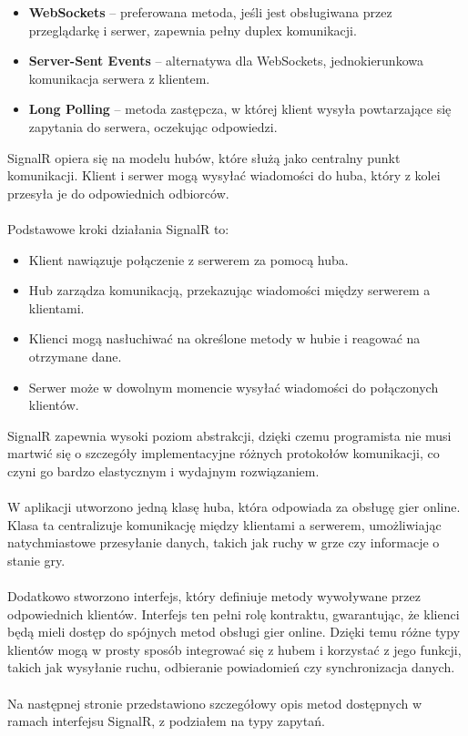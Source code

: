 \documentclass[12pt,a4paper]{article}
\begin{document}
\begin{itemize}
    \item \textbf{WebSockets} – preferowana metoda, jeśli jest obsługiwana przez przeglądarkę i serwer, zapewnia pełny duplex komunikacji.
    \item \textbf{Server-Sent Events} – alternatywa dla WebSockets, jednokierunkowa komunikacja serwera z klientem.
    \item \textbf{Long Polling} – metoda zastępcza, w której klient wysyła powtarzające się zapytania do serwera, oczekując odpowiedzi.
\end{itemize}

\noindent
SignalR opiera się na modelu hubów, które służą jako centralny punkt komunikacji. Klient i serwer mogą wysyłać wiadomości do huba, który z kolei przesyła je do odpowiednich odbiorców. 
\\\\
Podstawowe kroki działania SignalR to:

\begin{itemize}
    \item Klient nawiązuje połączenie z serwerem za pomocą huba.
    \item Hub zarządza komunikacją, przekazując wiadomości między serwerem a klientami.
    \item Klienci mogą nasłuchiwać na określone metody w hubie i reagować na otrzymane dane.
    \item Serwer może w dowolnym momencie wysyłać wiadomości do połączonych klientów.
\end{itemize}

\noindent
SignalR zapewnia wysoki poziom abstrakcji, dzięki czemu programista nie musi martwić się o szczegóły implementacyjne różnych protokołów komunikacji, co czyni go bardzo elastycznym i wydajnym rozwiązaniem.
\\\\
W aplikacji utworzono jedną klasę huba, która odpowiada za obsługę gier online. Klasa ta centralizuje komunikację między klientami a serwerem, umożliwiając natychmiastowe przesyłanie danych, takich jak ruchy w grze czy informacje o stanie gry.
\\\\
Dodatkowo stworzono interfejs, który definiuje metody wywoływane przez odpowiednich klientów. Interfejs ten pełni rolę kontraktu, gwarantując, że klienci będą mieli dostęp do spójnych metod obsługi gier online. Dzięki temu różne typy klientów mogą w prosty sposób integrować się z hubem i korzystać z jego funkcji, takich jak wysyłanie ruchu, odbieranie powiadomień czy synchronizacja danych.
\\\\
Na następnej stronie przedstawiono szczegółowy opis metod dostępnych w ramach interfejsu SignalR, z podziałem na typy zapytań.
\end{document}
